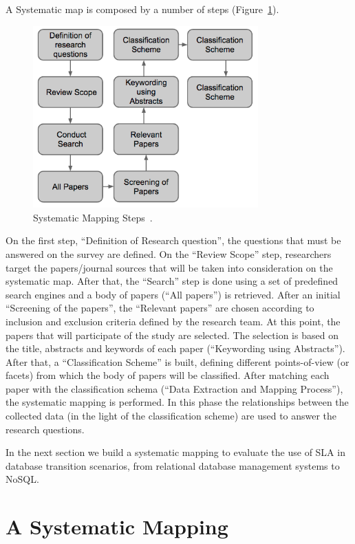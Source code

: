 \documentclass[a4paper]{IEEEtran}
\begin{document}
A Systematic map is composed by a number of steps (Figure~\ref{fig:sms}).
\begin{figure}[ht!]
\centering
\includegraphics[height=70mm]{pic1.png}
\caption{Systematic Mapping Steps~\cite{Petersen:2008:SMS:2227115.2227123}.\label{fig:sms}}
\end{figure}

On the first step, ``Definition of Research question'', the questions that must be answered on the survey are defined. 
On the ``Review Scope'' step, researchers target the papers/journal sources that will be taken into consideration on the systematic map. 
After that, the ``Search'' step is done using a set of predefined search engines and a body of papers (``All papers'') is retrieved. 
After an initial ``Screening of the papers'', the ``Relevant papers'' are chosen according to inclusion and exclusion criteria defined by the research team. 
At this point, the papers that will participate of the study are selected. 
The selection is based on the title, abstracts and keywords of each paper (``Keywording using Abstracts'').
After that, a ``Classification Scheme'' is built, defining different points-of-view (or facets) from which the body of papers will be classified. 
After matching each paper with the classification schema (``Data Extraction and Mapping Process''), the  systematic mapping is performed.
In this phase the relationships between the collected data (in the light of the classification scheme) are used to answer the research questions.


In the next section we build a systematic mapping to evaluate the use of SLA in database transition scenarios, from relational database management systems to NoSQL.


\section{A Systematic Mapping}
\label{sec:asm}
\end{document}
